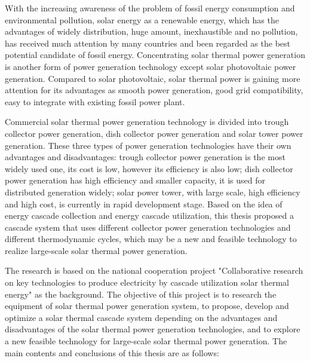 \enabstract
{
With the increasing awareness of the problem of fossil energy consumption and environmental pollution, solar energy as a renewable energy, which has the advantages of widely distribution, huge amount, inexhaustible and no pollution, has received much attention by many countries and been regarded as the best potential candidate of fossil energy. Concentrating solar thermal power generation is another form of power generation technology except solar photovoltaic power generation. Compared to solar photovoltaic, solar thermal power is gaining more attention for its advantages as smooth power generation, good grid compatibility, easy to integrate with existing fossil power plant.

Commercial solar thermal power generation technology is divided into trough collector power generation, dish collector power generation and solar tower power generation. These three types of power generation technologies have their own advantages and disadvantages: trough collector power generation is the most widely used one, its cost is low, however its efficiency is also low; dish collector power generation has high efficiency and smaller capacity, it is used for distributed generation widely; solar power tower, with large scale, high efficiency and high cost, is currently in rapid development stage. Based on the idea of ​​energy cascade collection and energy cascade utilization, this thesis proposed a cascade system that uses different collector power generation technologies and different thermodynamic cycles, which may be a new and feasible technology to realize large-scale solar thermal power generation.

The research is based on the national cooperation project "Collaborative research on key technologies to produce electricity by cascade utilization solar thermal energy" as the background. The objective of this project is to research the equipment of solar thermal power generation system, to propose, develop and optimize a solar thermal cascade system depending on the advantages and disadvantages of the solar thermal power generation technologies, and to explore a new feasible technology for large-scale solar thermal power generation. The main contents and conclusions of this thesis are as follows:

}
